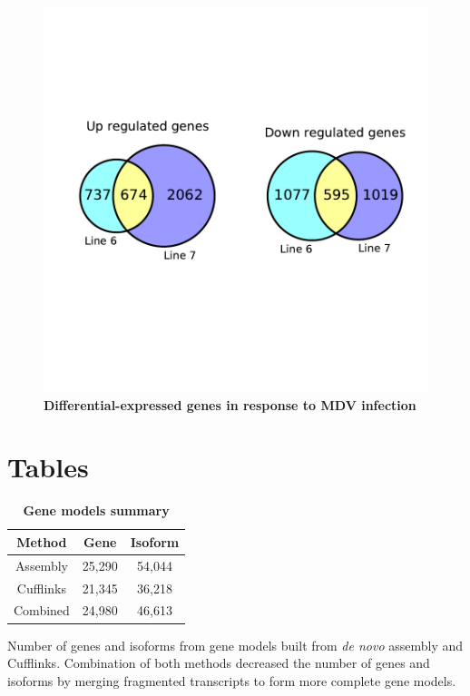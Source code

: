 \documentclass[10pt]{article}
\begin{document}
\begin{figure}[!ht]
    \begin{center}
        \includegraphics[width=6in]{degenes_venn.pdf}
    \end{center}
    \caption{
        {\bf Differential-expressed genes in response to MDV infection}
    }
    \label{degenes_venn}
\end{figure}

\section*{Tables}

\begin{table}[!ht]
\caption{
\bf{Gene models summary}}
\begin{tabular}{ccc}
\hline
Method & Gene & Isoform \\
\hline
Assembly & 25,290 & 54,044 \\
Cufflinks & 21,345 & 36,218 \\
Combined & 24,980 & 46,613 \\
\hline
\end{tabular}
\begin{flushleft}Number of genes and isoforms from gene models
built from \textit{de novo} assembly and Cufflinks.
Combination of both methods decreased the number of genes
and isoforms by merging fragmented transcripts to
form more complete gene models.
\end{flushleft}
\label{tab:gene_models}
\end{table}
\end{document}

